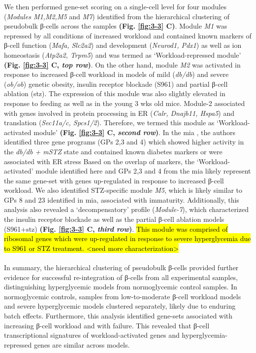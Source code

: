 We then performed gene-set scoring on a single-cell level for four modules (\textit{Modules M1,M2,M5} and \textit{M7}) identified from the hierarchical clustering of pseudobulk β-cells across the samples \textbf{(Fig. \ref{fig:3-3} C)}. Module \textit{M1} was repressed by all conditions of increased workload and contained known markers of β-cell function (\textit{Mafa, Slc2a2}) and development (\textit{Neurod1, Pdx1}) as well as ion homeostasis (\textit{Atp2a2, Trpm5}) and was termed as `Workload-repressed module' \textbf{(Fig. \ref{fig:3-3} C, \textit{top row})}. On the other hand, module \textit{M2} was activated in response to increased β-cell workload in models of mild (\textit{db/db}) and severe (\textit{ob/ob}) genetic obesity, insulin receptor blockade (S961) and partial β-cell ablation (\gls{stz}). The expression of this module was also slightly elevated in response to feeding as well as in the young 3 wks old mice. Module-2 associated with genes involved in protein processing in ER (\textit{Calr, Dnajb11, Hspa5}) and translation (\textit{Sec11a/c, Spcs1/2}). Therefore, we termed this module as ‘Workload-activated module’ \textbf{(Fig. \ref{fig:3-3} C, \textit{second row})}. In the \gls{mia} \textbf{\cite{hrovatin_delineating_2023}}, the authors identified three gene programs (GPs 2,3 and 4) which showed higher activity in the \textit{db/db + mSTZ} state and contained known diabetes markers or were associated with ER stress Based on the overlap of markers, the `Workload-activated' module identified here and GPs 2,3 and 4 from the \gls{mia} likely represent the same gene-set with genes up-regulated in response to increased β-cell workload. We also identified STZ-specific module \textit{M5}, which is likely similar to GPs 8 and 23 identified in \gls{mia}, associated with immaturity. Additionally, this analysis also revealed a ‘decompensatory’ profile (\textit{Module-7}), which characterized the insulin receptor blockade as well as the partial β-cell ablation models (S961+\gls{stz}) \textbf{(Fig. \ref{fig:3-3} C, \textit{third row})}. \hl{This module was comprised of ribosomal genes which were up-regulated in response to severe hyperglycemia due to S961 or STZ treatment. <need more characterization>}\\\\
In summary, the hierarchical clustering of pseudobulk β-cells provided further evidence for successful re-integration of β-cells from all experimental samples, distinguishing hyperglycemic models from normoglycemic control samples. In normoglycemic controls, samples from low-to-moderate β-cell workload models and severe hyperglycemic models clustered separately, likely due to enduring batch effects. Furthermore, this analysis identified gene-sets associated with increasing β-cell workload and with failure. This revealed that β-cell transcriptional signatures of workload-activated genes and hyperglycemia-repressed genes are similar across models.


